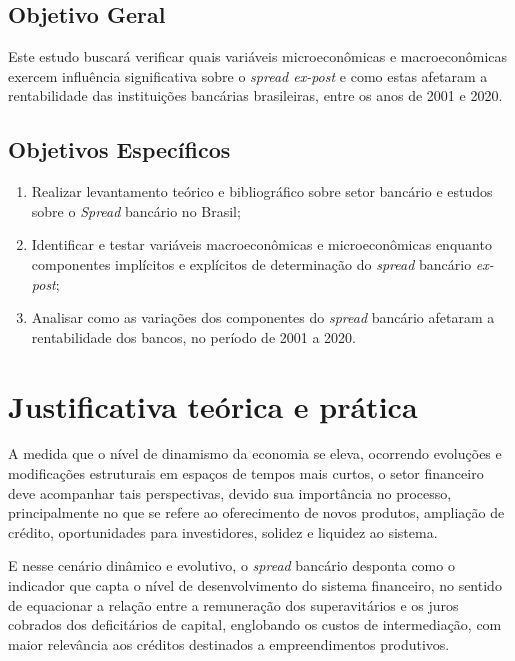 \documentclass[12pt,12pt,openright,oneside,a4paper,chapter=TITLE,section=TITLE,subsection=TITLE,subsubsection=TITLE,english,french,spanish,portugues,sumario=tradicional]{abntex2}
\providecommand{\tightlist}{%
  \setlength{\itemsep}{0pt}\setlength{\parskip}{0pt}}
\begin{document}
\subsection{Objetivo Geral}

Este estudo buscará verificar quais variáveis microeconômicas e macroeconômicas exercem influência significativa sobre o \emph{spread ex-post} e como estas afetaram a rentabilidade das instituições bancárias brasileiras, entre os anos de 2001 e 2020.

\subsection{Objetivos Específicos}

\begin{enumerate}
\def\labelenumi{\arabic{enumi}.}
\tightlist
\item
  Realizar levantamento teórico e bibliográfico sobre setor bancário e estudos sobre o \emph{Spread} bancário no Brasil;
\item
  Identificar e testar variáveis macroeconômicas e microeconômicas enquanto componentes implícitos e explícitos de determinação do \emph{spread} bancário \emph{ex-post};
\item
  Analisar como as variações dos componentes do \emph{spread} bancário afetaram a rentabilidade dos bancos, no período de 2001 a 2020.
\end{enumerate}

\section{Justificativa teórica e prática}

A medida que o nível de dinamismo da economia se eleva, ocorrendo evoluções e modificações estruturais em espaços de tempos mais curtos, o setor financeiro deve acompanhar tais perspectivas, devido sua importância no processo, principalmente no que se refere ao oferecimento de novos produtos, ampliação de crédito, oportunidades para investidores, solidez e liquidez ao sistema.

E nesse cenário dinâmico e evolutivo, o \emph{spread} bancário desponta como o indicador que capta o nível de desenvolvimento do sistema financeiro, no sentido de equacionar a relação entre a remuneração dos superavitários e os juros cobrados dos deficitários de capital, englobando os custos de intermediação, com maior relevância aos créditos destinados a empreendimentos produtivos.
\end{document}
